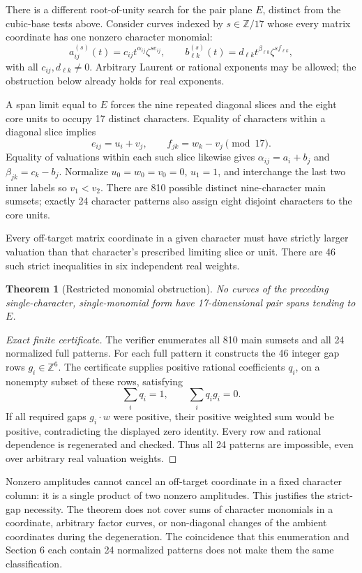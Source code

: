 \documentclass[11pt]{article}
\newtheorem{theorem}{Theorem}[section]
\theoremstyle{definition}\newtheorem{definition}[theorem]{Definition}
\theoremstyle{remark}\newtheorem{remark}[theorem]{Remark}
\begin{document}
There is a different root-of-unity search for the pair plane $E$, distinct
from the cubic-base tests above. Consider curves indexed by $s\in\mathbb Z/17$
whose every matrix coordinate has one nonzero character monomial:
\[
 a_{ij}^{(s)}(t)=c_{ij}t^{\alpha_{ij}}\zeta^{s e_{ij}},\qquad
 b_{\ell k}^{(s)}(t)=d_{\ell k}t^{\beta_{\ell k}}\zeta^{s f_{\ell k}},
\]
with all $c_{ij},d_{\ell k}\ne0$. Arbitrary Laurent or rational exponents may
be allowed; the obstruction below already holds for real exponents.

A span limit equal to $E$ forces the nine repeated diagonal slices and the
eight core units to occupy 17 distinct characters. Equality of characters
within a diagonal slice implies
\[
 e_{ij}=u_i+v_j,\qquad f_{jk}=w_k-v_j\pmod {17}.
\]
Equality of valuations within each such slice likewise gives
$\alpha_{ij}=a_i+b_j$ and $\beta_{jk}=c_k-b_j$.
Normalize $u_0=w_0=v_0=0$, $u_1=1$, and interchange the last two inner labels
so $v_1<v_2$. There are 810 possible distinct nine-character main sumsets;
exactly 24 character patterns also assign eight disjoint characters to the
core units.

Every off-target matrix coordinate in a given character must have strictly
larger valuation than that character's prescribed limiting slice or unit.
There are 46 such strict inequalities in six independent real weights.

\begin{theorem}[Restricted monomial obstruction]\label{thm:toric}
No curves of the preceding single-character, single-monomial form have
17-dimensional pair spans tending to $E$.
\end{theorem}
\begin{proof}[Exact finite certificate]
The verifier enumerates all 810 main sumsets and all 24 normalized full
patterns. For each full pattern it constructs the 46 integer gap rows
$g_i\in\mathbb Z^6$. The certificate supplies positive rational coefficients
$q_i$, on a nonempty subset of these rows, satisfying
\[
 \sum_iq_i=1,\qquad \sum_iq_i g_i=0.
\]
If all required gaps $g_i\cdot w$ were positive, their positive weighted
sum would be positive, contradicting the displayed zero identity. Every
row and rational dependence is regenerated and checked. Thus all 24
patterns are impossible, even over arbitrary real valuation weights.
\end{proof}

Nonzero amplitudes cannot cancel an off-target coordinate in a fixed
character column: it is a single product of two nonzero amplitudes.
This justifies the strict-gap necessity. The theorem does not cover sums
of character monomials in a coordinate, arbitrary factor curves, or
non-diagonal changes of the ambient coordinates during the degeneration.
The coincidence that this enumeration and Section 6 each contain 24
normalized patterns does not make them the same classification.
\end{document}

